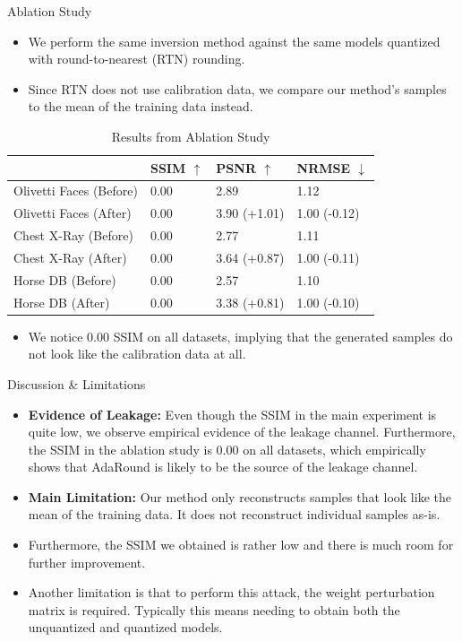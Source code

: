 \documentclass{beamer}
\begin{document}
\begin{frame}{Ablation Study}
  \begin{itemize}
    \item We perform the same inversion method against the same models quantized with round-to-nearest (RTN) rounding.
    \item Since RTN does not use calibration data, we compare our method's samples to the mean of the training data instead. 
  \end{itemize}
\begin{table}
\centering \scriptsize
\caption{Results from Ablation Study}
\label{tab:ablation}
\begin{tabular}{|l|l|l|l|}
\hline
 &  SSIM $\uparrow$ & PSNR $\uparrow$ & NRMSE $\downarrow$ \\ \hline
Olivetti Faces (Before) & 0.00 & 2.89 & 1.12 \\ \hline
Olivetti Faces (After) & 0.00 & 3.90 (+1.01) & 1.00 (-0.12) \\ \hline
Chest X-Ray (Before) & 0.00 & 2.77 & 1.11 \\ \hline
Chest X-Ray (After) & 0.00 & 3.64 (+0.87) & 1.00 (-0.11) \\ \hline
Horse DB (Before) & 0.00 & 2.57 & 1.10 \\ \hline
Horse DB (After) & 0.00 & 3.38 (+0.81) & 1.00 (-0.10) \\ \hline
\end{tabular}
\end{table}
\begin{itemize}
  \item We notice 0.00 SSIM on all datasets, implying that the generated samples do not look like the calibration data at all.
\end{itemize}
\end{frame}
\begin{frame}{Discussion \& Limitations}
  \begin{itemize}
    \item \textbf{Evidence of Leakage:} Even though the SSIM in the main experiment is quite low, we observe empirical evidence of the leakage channel. Furthermore, the SSIM in the ablation study is 0.00 on all datasets, which empirically shows that AdaRound is likely to be the source of the leakage channel.
    \item \textbf{Main Limitation:} Our method only reconstructs samples that look like the mean of the training data. It does not reconstruct individual samples as-is. 
    \item Furthermore, the SSIM we obtained is rather low and there is much room for further improvement.
    \item Another limitation is that to perform this attack, the weight perturbation matrix is required. Typically this means needing to obtain both the unquantized and quantized models.
  \end{itemize}
\end{frame}
\end{document}
